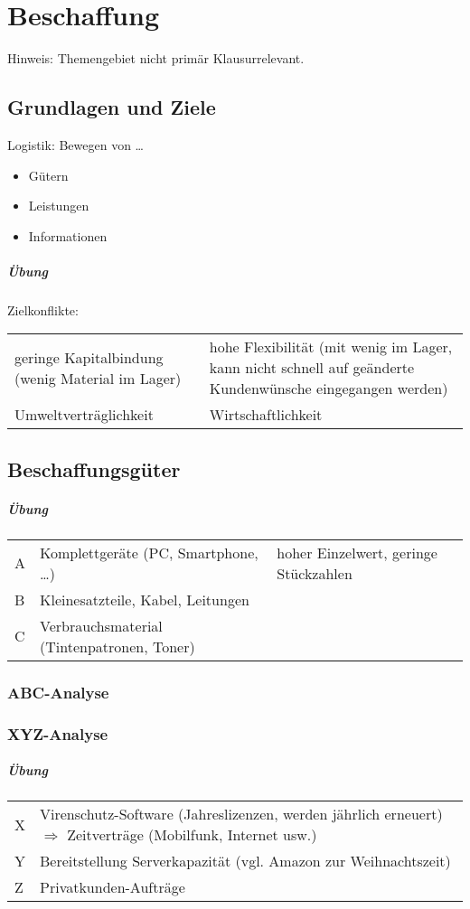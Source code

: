 \chapter{Beschaffung}
Hinweis: Themengebiet nicht primär Klausurrelevant.
\section{Grundlagen und Ziele}
Logistik: Bewegen von …
\begin{itemize}
\item Gütern
\item Leistungen
\item Informationen
\end{itemize}
\paragraph{Übung} Zielkonflikte:\\
\begin{tabular}{L{0.5} L{0.5}}
geringe Kapitalbindung (wenig Material im Lager) & hohe Flexibilität (mit wenig im Lager, kann nicht schnell auf geänderte Kundenwünsche eingegangen werden)\tabularnewline
Umweltverträglichkeit & Wirtschaftlichkeit
\end{tabular}
\section{Beschaffungsgüter}
\paragraph{Übung} \parskp
\begin{tabular}{l l l }
A & Komplettgeräte (PC, Smartphone, …) & hoher Einzelwert, geringe Stückzahlen\\
B & Kleinesatzteile, Kabel, Leitungen \\
C & Verbrauchsmaterial (Tintenpatronen, Toner)
\end{tabular}
\subsection{ABC-Analyse}
\subsection{XYZ-Analyse}
\paragraph{Übung} \parskp
\begin{tabular}{L{0.1} L{0.9}}
X & Virenschutz-Software (Jahreslizenzen, werden jährlich erneuert) $\Rightarrow$ Zeitverträge (Mobilfunk, Internet usw.)\\
Y & Bereitstellung Serverkapazität (vgl. Amazon zur Weihnachtszeit)\\
Z & Privatkunden-Aufträge
\end{tabular}
